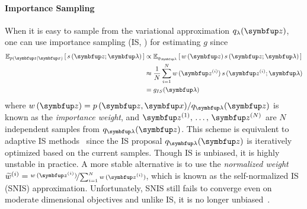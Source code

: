 \paragraph{Importance Sampling}
When it is easy to sample from the variational approximation \(q_{\lambda}(\vz)\), one can use importance sampling (IS, \citealt{robert_monte_2004, mcbook}) for estimating \(g\) since 
\vspace{-0.05in}
\begin{align}
  \Esub{p(\vz\mid\vx)}{ s\,(\vz; \vlambda) } 
  &\propto \Esub{q_{\vlambda}}{ w\,(\vz) \, s\,(\vz; \vlambda) } \\
  &\approx \frac{1}{N} \sum^{N}_{i=1} w\,(\vz^{(i)}) \, s\,(\vz^{(i)}; \vlambda) \\
  &= g_{IS}(\vlambda)
\end{align}
where \(w\,(\vz) = p\,(\vz,\vx) / q_{\vlambda}(\vz)\) is known as the \textit{importance weight}, and \(\vz^{(1)},\, \ldots,\, \vz^{(N)}\) are \(N\) independent samples from \(q_{\vlambda}(\vz)\).
This scheme is equivalent to adaptive IS methods~\citep{cappe_adaptive_2008, bugallo_adaptive_2017} since the IS proposal \(q_{\vlambda}(\vz)\) is iteratively optimized based on the current samples.
Though IS is unbiased, it is highly unstable in practice.
A more stable alternative is to use the \textit{normalized weight} \(\widetilde{w}^{(i)} = \nicefrac{w\,(\vz^{(i)})}{\sum_{i=1}^N w\,(\vz^{(i)}) }\), which is known as the self-normalized IS (SNIS) approximation.
Unfortunately, SNIS still fails to converge even on moderate dimensional objectives and unlike IS, it is no longer unbiased~\citep{robert_monte_2004, mcbook}.

